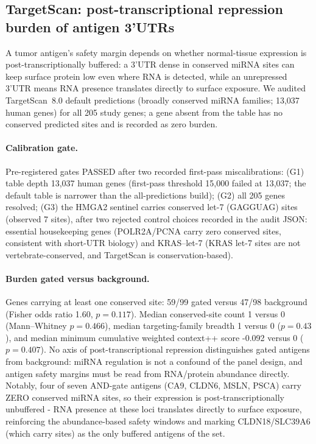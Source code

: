 \subsection{TargetScan: post-transcriptional repression burden of antigen 3'UTRs}
\label{sec:targetscan}
A tumor antigen's safety margin depends on whether normal-tissue expression
is post-transcriptionally buffered: a 3'UTR dense in conserved miRNA sites
can keep surface protein low even where RNA is detected, while an
unrepressed 3'UTR means RNA presence translates directly to surface
exposure. We audited TargetScan~8.0 default predictions (broadly conserved
miRNA families; 13,037 human genes) for all 205 study genes; a gene
absent from the table has no conserved predicted sites and is recorded as
zero burden.

\paragraph{Calibration gate.} Pre-registered gates PASSED after two recorded
first-pass miscalibrations: (G1) table depth 13,037 human genes (first-pass
threshold 15,000 failed at 13,037; the default table is narrower than the
all-predictions build); (G2) all 205 genes resolved; (G3) the HMGA2
sentinel carries conserved let-7 (GAGGUAG) sites (observed 7 sites),
after two rejected control choices recorded in the audit JSON: essential
housekeeping genes (POLR2A/PCNA carry zero conserved sites, consistent with
short-UTR biology) and KRAS--let-7 (KRAS let-7 sites are not
vertebrate-conserved, and TargetScan is conservation-based).

\paragraph{Burden gated versus background.} Genes carrying at least one
conserved site: 59/99 gated versus 47/98 background (Fisher
odds ratio 1.60, $p=0.117$). Median conserved-site count 1 versus
0 (Mann--Whitney $p=0.466$), median targeting-family breadth 1
versus 0 ($p=0.43$), and median minimum cumulative weighted context++
score -0.092 versus 0 ($p=0.407$). No axis of post-transcriptional repression distinguishes gated antigens from background: miRNA regulation is not a confound of the panel design, and antigen safety margins must be read from RNA/protein abundance directly. Notably, four of seven AND-gate antigens (CA9, CLDN6, MSLN, PSCA) carry ZERO conserved miRNA sites, so their expression is post-transcriptionally unbuffered - RNA presence at these loci translates directly to surface exposure, reinforcing the abundance-based safety windows and marking CLDN18/SLC39A6 (which carry sites) as the only buffered antigens of the set.

